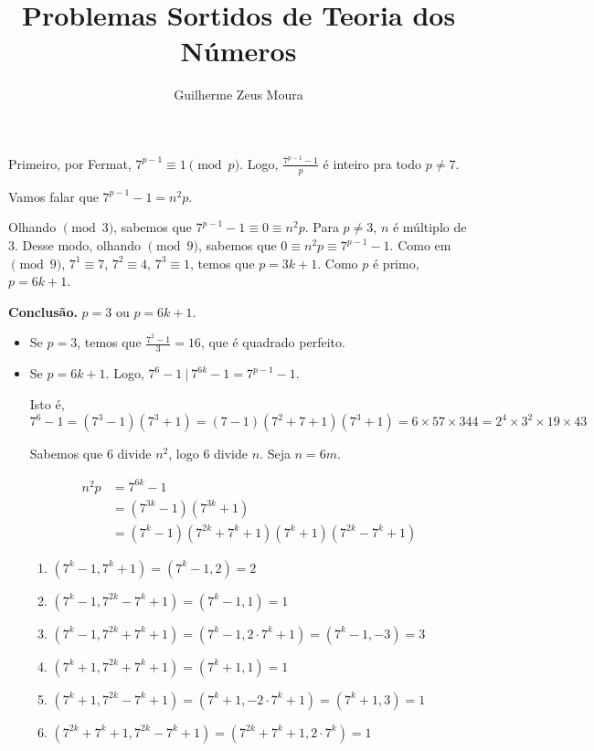 \documentclass[10pt, a4paper]{article}
\title{Problemas Sortidos de Teoria dos Números}
\author{Guilherme Zeus Moura}
\begin{document}
	

	\setcounter{prob}{6}


	Primeiro, por Fermat, $7^{p-1} \equiv 1 \pmod{p}$. Logo, $\frac{7^{p-1} - 1}{p}$ é inteiro pra todo $p \neq 7$.

	Vamos falar que $7^{p-1} - 1 = n^2p$.

	Olhando $\pmod{3}$, sabemos que $7^{p-1} - 1 \equiv 0 \equiv n^2p.$ Para $p \neq 3$, $n$ é múltiplo de $3$. Desse modo, olhando $\pmod{9}$, sabemos que $0 \equiv n^2p \equiv 7^{p-1} - 1$. Como em $\pmod{9}$, $7^1 \equiv 7$, $7^2 \equiv 4$, $7^3 \equiv 1$, temos que $p = 3k + 1$. Como $p$ é primo, $p = 6k+1$.

	\textbf{Conclusão.} $p = 3$ ou $p = 6k + 1$.

	\begin{itemize}
		\item Se $p=3$, temos que $\frac{7^2 - 1}{3} = 16$, que é quadrado perfeito.
		
		\item Se $p = 6k + 1$. Logo, $7^6 - 1 \ |\  7^{6k} - 1 = 7^{p-1} - 1$.

		Isto é, $7^6 - 1 = (7^3 - 1)(7^3 + 1) = (7 - 1)(7^2 + 7 + 1)(7^3 + 1) = 6 \times 57 \times 344 = 2^4 \times 3^2 \times 19 \times 43$

		Sabemos que $6$ divide $n^2$, logo $6$ divide $n$. Seja $n = 6m$.

		\begin{align*}
			n^2p &= 7^{6k} - 1\\
				 &= (7^{3k} - 1)(7^{3k} + 1)\\
				 &= (7^k-1)(7^{2k} + 7^k + 1)(7^k+1)(7^{2k} - 7^k + 1)
		\end{align*}

		\begin{enumerate}[label = \textbf{\alph*.}]
			\item $(7^k - 1, 7^k + 1) = (7^k - 1, 2) = 2$
			\item $(7^k - 1, 7^{2k} - 7^k + 1) = (7^k - 1, 1) = 1$
			\item $(7^k - 1, 7^{2k} + 7^k + 1) = (7^k - 1, 2\cdot7^k + 1) = (7^k - 1, -3) = 3$
			\item $(7^k + 1, 7^{2k} + 7^k + 1) = (7^k + 1, 1) = 1$
			\item $(7^k + 1, 7^{2k} - 7^k + 1) = (7^k + 1, -2\cdot7^k + 1) = (7^k + 1, 3) = 1$
			\item $(7^{2k} + 7^k + 1, 7^{2k} - 7^k + 1) = (7^{2k} + 7^{k} + 1, 2\cdot7^k) = 1$ 
		\end{enumerate}


\end{itemize}
\end{document}
